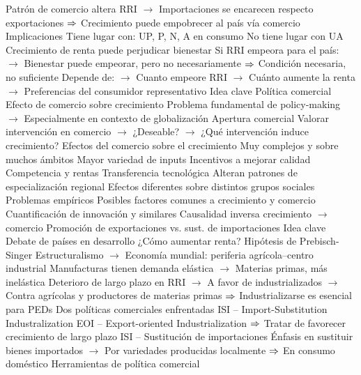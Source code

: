 \documentclass{nuevotema}
\begin{document}
\begin{esquemal}
				\4[] Patrón de comercio altera RRI
				\4[] $\to$ Importaciones se encarecen respecto exportaciones
				\4[] $\then$ Crecimiento puede empobrecer al país vía comercio
			\3 Implicaciones
				\4 Tiene lugar con:
				\4[] UP, P, N, A en consumo
				\4 No tiene lugar con
				\4[] UA
				\4[$\then$] Crecimiento de renta puede perjudicar bienestar
				\4[] 
				\4 Si RRI empeora para el país:
				\4[] $\to$ Bienestar puede empeorar, pero no necesariamente
				\4[] $\then$ Condición necesaria, no suficiente
				\4 Depende de:
				\4[] $\to$ Cuanto empeore RRI
				\4[] $\to$ Cuánto aumente la renta
				\4[] $\to$ Preferencias del consumidor representativo
	\1 
		\2 Idea clave
			\3 Política comercial
				\4 Efecto de comercio sobre crecimiento
				\4[] Problema fundamental de policy-making
				\4[] $\to$ Especialmente en contexto de globalización
				\4 Apertura comercial
				\4[] Valorar intervención en comercio
				\4[] $\to$ ¿Deseable?
				\4[] $\to$ ¿Qué intervención induce crecimiento?
			\3 Efectos del comercio sobre el crecimiento
				\4 Muy complejos y sobre muchos ámbitos
				\4[] Mayor variedad de inputs
				\4[] Incentivos a mejorar calidad
				\4[] Competencia y rentas
				\4[] Transferencia tecnológica
				\4[] Alteran patrones de especialización regional
				\4[] Efectos diferentes sobre distintos grupos sociales
				\4 Problemas empíricos
				\4[] Posibles factores comunes a crecimiento y comercio
				\4[] Cuantificación de innovación y similares
				\4[] Causalidad inversa crecimiento $\to$ comercio
		\2 Promoción de exportaciones vs. sust. de importaciones
			\3 Idea clave
				\4 Debate de países en desarrollo
				\4[] ¿Cómo aumentar renta?
				\4 Hipótesis de Prebisch-Singer
				\4[] Estructuralismo
				\4[] $\to$ Economía mundial: periferia agrícola--centro industrial
				\4[] Manufacturas tienen demanda elástica
				\4[] $\to$ Materias primas, más inelástica
				\4[] Deterioro de largo plazo en RRI
				\4[] $\to$ A favor de industrializados
				\4[] $\to$ Contra agrícolas y productores de materias primas
				\4[] $\then$ Industrializarse es esencial para PEDs
				\4 Dos políticas comerciales enfrentadas
				\4[] ISI -- Import-Substitution Industralization
				\4[] EOI -- Export-oriented Industrialization
				\4[] $\then$ Tratar de favorecer crecimiento de largo plazo
			\3 ISI -- Sustitución de importaciones
				\4 Énfasis en sustituir bienes importados
				\4[] $\to$ Por variedades producidas localmente
				\4[] $\then$ En consumo doméstico
				\4 Herramientas de política comercial

\end{esquemal}
\end{document}
